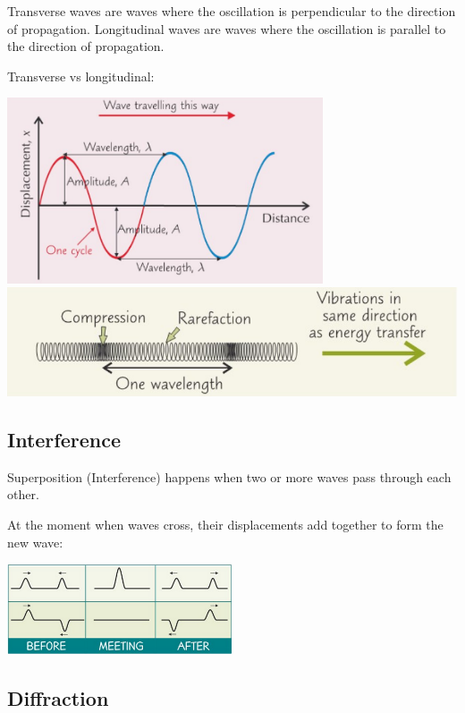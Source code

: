 \documentclass[a4paper, 12pt]{article}
\begin{document}
Transverse waves are waves where the oscillation is perpendicular to the direction of propagation. Longitudinal waves are waves where the oscillation is parallel to the direction of propagation.

Transverse vs longitudinal:

\begin{center}
\includegraphics[width=0.7\textwidth]{images/transverseWave.png}
\includegraphics[width=\textwidth]{images/longitudinalWave.png}
\end{center}

\subsection{Interference}

Superposition (Interference) happens when two or more waves pass through each other.

At the moment when waves cross, their displacements add together to form the new wave:

\begin{center}
\includegraphics[width=0.5\textwidth]{images/superposition.png}
\end{center}

\subsection{Diffraction}
\end{document}
